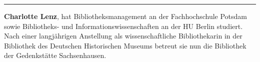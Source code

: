 \begin{center}\rule{0.5\linewidth}{0.5pt}\end{center}

\textbf{Charlotte Lenz}, hat Bibliotheksmanagement an der
Fachhochschule Potsdam sowie Bibliotheks- und Informationswissenschaften
an der HU Berlin studiert. Nach einer langjährigen Anstellung als
wissenschaftliche Bibliothekarin in der Bibliothek des Deutschen
Historischen Museums betreut sie nun die Bibliothek der Gedenkstätte
Sachsenhausen.
